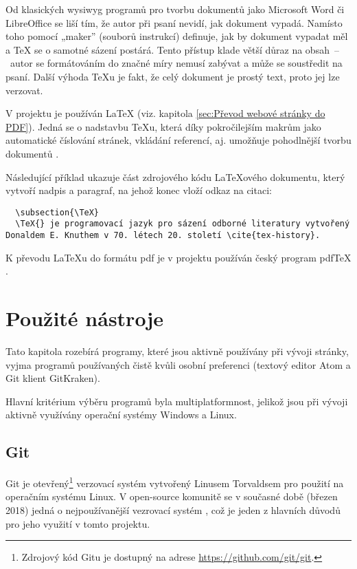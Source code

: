 \documentclass[a4paper, 12pt]{article}
\newcommand*{\fullref}[1]{\hyperref[{#1}]{\ref*{#1}}}
\begin{document}
  Od klasických \gls{wysiwyg} programů pro tvorbu dokumentů jako Microsoft Word či LibreOffice se liší tím, že autor při psaní nevidí, jak dokument vypadá. Namísto toho pomocí „maker” (souborů instrukcí) definuje, jak by dokument vypadat měl a \TeX{} se o samotné sázení postárá. Tento přístup klade větší důraz na obsah~--~autor se formátováním do značné míry nemusí zabývat a může se soustředit na psaní. Další výhoda \TeX u je fakt, že celý dokument je prostý text, proto jej lze verzovat.

  V projektu je používán \LaTeX{} (viz. kapitola \fullref{sec:Převod webové stránky do PDF}). Jedná se o nadstavbu \TeX u, která díky pokročilejším makrům jako automatické číslování stránek, vkládání referencí, aj. umožňuje pohodlnější tvorbu dokumentů \cite{getting-started-with-latex}.

  Následující příklad ukazuje část zdrojového kódu \LaTeX ového dokumentu, který vytvoří nadpis a paragraf, na jehož konec vloží odkaz na citaci:

  \begin{verbatim}
  \subsection{\TeX}
  \TeX{} je programovací jazyk pro sázení odborné literatury vytvořený Donaldem E. Knuthem v 70. létech 20. století \cite{tex-history}.
  \end{verbatim}

  K převodu \LaTeX u do formátu \gls{pdf} je v projektu používán český program pdf\TeX{} \cite{pdftex}. %


  \section{Použité nástroje} \label{sec:Použité nástroje}
  Tato kapitola rozebírá programy, které jsou aktivně používány při vývoji stránky, vyjma programů používaných čistě kvůli osobní preferenci (textový editor Atom a Git klient GitKraken).

  Hlavní kritérium výběru programů byla multiplatformnost, jelikož jsou při vývoji aktivně využívány operační systémy Windows a Linux.


  \subsection{Git} \label{sec:Git}
  Git je otevřený\footnote{Zdrojový kód Gitu je dostupný na adrese \url{https://github.com/git/git}.} verzovací systém vytvořený Linusem Torvaldsem pro použití na operačním systému Linux. V open-source komunitě se v současné době (březen 2018) jedná o nejpoužívanější vezrovací systém \cite{version-control-usage-statistics}, což je jeden z hlavních důvodů pro jeho využití v tomto projektu.
\end{document}
